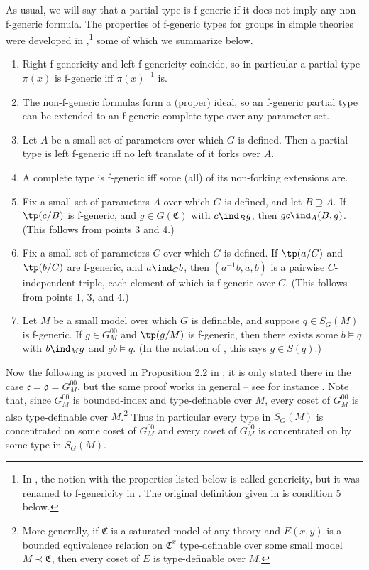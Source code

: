\documentclass[10pt]{article}
\begin{document}
{As usual, we will say that a partial type is f-generic if it does not imply any non-f-generic formula. The properties of f-generic types for groups in simple theories were developed in \cite{pillay},\footnote[1]{In \cite{pillay}, the notion with the properties listed below is called genericity, but it was renamed to f-genericity in \cite{newelski_petrykowski}. The original definition given in \cite{pillay} is condition 5 below.} some of which we summarize below.

\begin{fact}\label{f-gen_facts}
\begin{enumerate}
    \item Right f-genericity and left f-genericity coincide, so in particular a partial type $\pi(x)$ is f-generic iff $\pi(x)^{-1}$ is.
    \item The non-f-generic formulas form a (proper) ideal, so an f-generic partial type can be extended to an f-generic complete type over any parameter set.
    \item Let $A$ be a small set of parameters over which $G$ is defined. Then a partial type is left f-generic iff no left translate of it forks over $A$.
    \item A complete type is f-generic iff some (all) of its non-forking extensions are.
    \item Fix a small set of parameters $A$ over which $G$ is defined, and let $B\supseteq A$. If $\tp(c/B)$ is f-generic, and $g\in G(\mathfrak{C})$ with $c\ind_B g$, then $gc\ind_A (B,g)$. (This follows from points 3 and 4.)
    \item Fix a small set of parameters $C$ over which $G$ is defined. If $\tp(a/C)$ and $\tp(b/C)$ are f-generic, and $a\ind_C b$, then $(a^{-1}b,a,b)$ is a pairwise $C$-independent triple, each element of which is f-generic over $C$. (This follows from points 1, 3, and 4.)
    \item Let $M$ be a small model over which $G$ is definable, and suppose $q\in S_G(M)$ is f-generic. If $g\in G^{00}_M$ and $\tp(g/M)$ is f-generic, then there exists some $b\models q$ with $b\ind_M g$ and $gb\models q$. (In the notation of \cite{pillay}, this says $g\in S(q)$.)%
\end{enumerate}
\end{fact}



Now the following is proved in Proposition 2.2 in \cite{pillay_scanlon_wagner}; it is only stated there in the case $\mathfrak{c}=\mathfrak{d}=G^{00}_M$, but the same proof works in general – see for instance \cite{martin-pizarro_pillay}. Note that, since $G^{00}_M$ is bounded-index and type-definable over $M$, every coset of $G^{00}_M$ is also type-definable over $M$.\footnote{More generally, if $\mathfrak{C}$ is a saturated model of any theory and $E(x,y)$ is a bounded equivalence relation on $\mathfrak{C}^x$ type-definable over some small model $M\prec\mathfrak{C}$, then every coset of $E$ is type-definable over $M$.} Thus in particular every type in $S_G(M)$ is concentrated on some coset of $G^{00}_M$ and every coset of $G^{00}_M$ is concentrated on by some type in $S_G(M)$.

}
\end{document}
